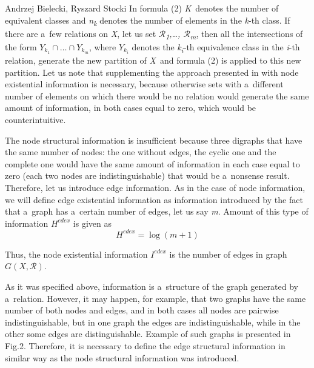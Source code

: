 \begin{artengenv2auth}{Andrzej Bielecki, Ryszard Stocki}
In formula (2) \textit{K}~denotes the number of equivalent classes and \textit{n}\textit{\textsubscript{k}} denotes the number of elements in the \textit{k}{}-th class. If there are a~few relations on \textit{X}, let us set $\mathcal{R}$\textit{\textsubscript{1}}\textit{,…, $\mathcal{R}$}\textit{\textsubscript{m}}, then all the intersections of the form $Y_{k_1}{\cap}{\dots}{\cap}Y_{k_m}$, where $Y_{k_i}$ denotes the \textit{k}\textit{\textsubscript{i}}\textit{{}-}th equivalence class in the \textit{i}{}-th relation, generate the new partition of \textit{X}~and formula (2) is applied to this new partition. Let us note that supplementing the approach presented in 
\parencite[][]{bielecki_information_2022} %
 with node existential information is necessary, because otherwise sets with a~different number of elements on which there would be no relation would generate the same amount of information, in both cases equal to zero, which would be counterintuitive.



The node structural information is insufficient because three digraphs that have the same number of nodes: the one without edges, the cyclic one and the complete one would have the same amount of information in each case equal to zero (each two nodes are indistinguishable) that would be a~nonsense result. Therefore, let us introduce edge information. As in the case of node information, we will define edge existential information as information introduced by the fact that a~graph has a~certain number of edges, let us say \textit{m}. Amount of this type of information $H^{\textit{edex}}$ is given as
\begingroup
\reqnos
\begin{equation}
H^{\textit{edex}}=\log (m+1)
\end{equation}
\endgroup

Thus, the node existential information $I^{\textit{edex}}$ is the number of edges in graph $G(X,\mathcal{R})$.

As it was specified above, information is a~structure of the graph generated by a~relation. However, it may happen, for example, that two graphs have the same number of both nodes and edges, and in both cases all nodes are pairwise indistinguishable, but in one graph the edges are indistinguishable, while in the other some edges are distinguishable. Example of such graphs is presented in Fig.2. Therefore, it is necessary to define the edge structural information in similar way as the node structural information was introduced.



\end{artengenv2auth}
